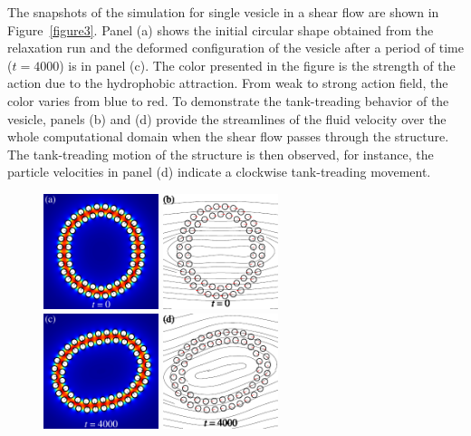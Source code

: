 \documentclass[lineno]{jfm}
\begin{document}
The snapshots of the simulation for single vesicle in a shear flow are shown in Figure~\ref{figure3}.
Panel (a) shows the initial circular shape obtained from the relaxation run and the deformed 
configuration of the vesicle after a period of time ($t=4000$) is in panel (c). The color presented in the figure 
is the strength of the action due to the hydrophobic attraction. From weak to strong action field, the color
varies from blue to red.
To demonstrate the tank-treading behavior of the vesicle, panels (b) and (d) provide the streamlines of the 
fluid velocity over the whole computational domain when the shear flow passes through the structure. The tank-treading motion of the structure is then observed, for instance, the particle velocities in panel (d) indicate a clockwise tank-treading movement.


\begin{figure}
\centering
\includegraphics[width=0.3\textwidth]{N58_0.pdf}
\includegraphics[width=0.3\textwidth]{N58_vel_0.pdf}\\
\includegraphics[width=0.3\textwidth]{N58_20000.pdf}
\includegraphics[width=0.3\textwidth]{N58_vel_20000.pdf}

\end{figure}
\end{document}
